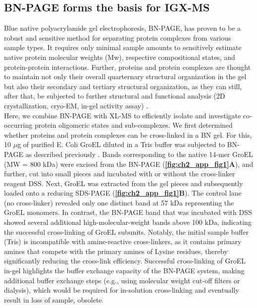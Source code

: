 \subsection*{BN-PAGE forms the basis for IGX-MS}
Blue native polyacrylamide gel electrophoresis, BN-PAGE, has proven to be a robust and sensitive method for separating protein complexes from various sample types. It requires only minimal sample amounts to sensitively estimate native protein molecular weights (Mw), respective compositional states, and protein-protein interactions. Further, proteins and protein complexes are thought to maintain not only their overall quarternary structural organization in the gel but also their secondary and tertiary structural organization, as they can still, after that, be subjected to further structural and functional analysis (2D crystallization, cryo-EM, in-gel activity assay) \cite{Poetsch_2000, Schafer_2006, Wittig_2007}.\\
Here, we combine BN-PAGE with XL-MS to efficiently isolate and investigate co-occurring protein oligomeric states and sub-complexes. We first determined whether proteins and protein complexes can be cross-linked in a BN gel. For this, 10 $\mu$g of purified E. Coli GroEL diluted in a Tris buffer was subjected to BN-PAGE as described previously \cite{Wittig_2006}. Bands corresponding to the native 14-mer GroEL (MW = 800 kDa) were excised from the BN-PAGE (\textbf{\autoref{fig:ch2_app_fig1}A}), and further, cut into small pieces and incubated with or without the cross-linker reagent DSS. Next, GroEL was extracted from the gel pieces and subsequently loaded onto a reducing SDS-PAGE (\textbf{\autoref{fig:ch2_app_fig1}B}). The control lane (no cross-linker) revealed only one distinct band at 57 kDa representing the GroEL monomers. In contrast, the BN-PAGE band that was incubated with DSS showed several additional high-molecular-weight bands above 100 kDa, indicating the successful cross-linking of GroEL subunits. Notably, the initial sample buffer (Tris) is incompatible with amine-reactive cross-linkers, as it contains primary amines that compete with the primary amines of Lysine residues, thereby significantly reducing the cross-link efficiency. Successful cross-linking of GroEL in-gel highlights the buffer exchange capacity of the BN-PAGE system, making additional buffer exchange steps (e.g., using molecular weight cut-off filters or dialysis), which would be required for in-solution cross-linking and eventually result in loss of sample, obsolete.

